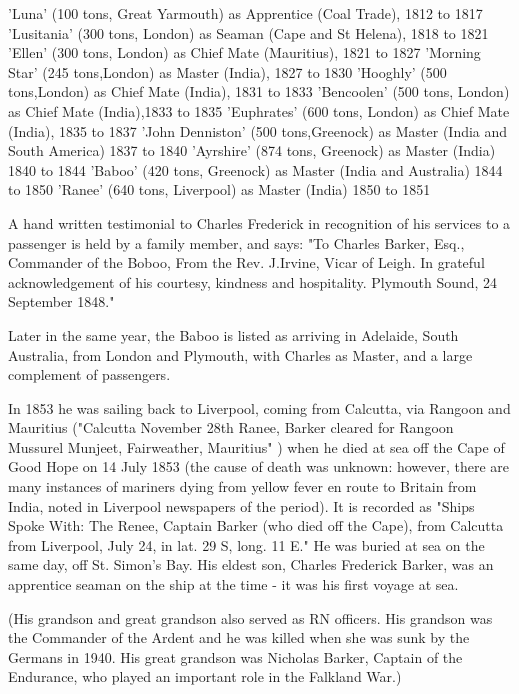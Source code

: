 'Luna' (100 tons, Great Yarmouth) as Apprentice (Coal Trade), 1812 to 1817
'Lusitania' (300 tons, London) as Seaman (Cape and St Helena), 1818 to 1821
'Ellen' (300 tons, London) as Chief Mate (Mauritius), 1821 to 1827
'Morning Star' (245 tons,London) as Master (India), 1827 to 1830
'Hooghly' (500 tons,London) as Chief Mate (India), 1831 to 1833
'Bencoolen' (500 tons, London) as Chief Mate (India),1833 to 1835
'Euphrates' (600 tons, London) as Chief Mate (India), 1835 to 1837
'John Denniston' (500 tons,Greenock) as Master (India and South America) 1837 to 1840
'Ayrshire' (874 tons, Greenock) as Master (India) 1840 to 1844
'Baboo' (420 tons, Greenock) as Master (India and Australia) 1844 to 1850
'Ranee' (640 tons, Liverpool) as Master (India) 1850 to 1851
\cite{CFBShipList}


A hand written testimonial to Charles Frederick in recognition of his services to a passenger is held by a family member, and says:
"To Charles Barker, Esq., Commander of the Boboo,
From the Rev. J.Irvine, Vicar of Leigh.
In grateful acknowledgement of his courtesy, kindness and hospitality.
Plymouth Sound, 24 September 1848."

Later in the same year, the Baboo is listed as arriving in Adelaide, South Australia, from London and Plymouth, with Charles as Master, and a large complement of passengers.\cite{CFBBaboo}

In 1853 he was sailing back to Liverpool, coming from Calcutta, via Rangoon and Mauritius ("Calcutta November 28th Ranee, Barker cleared for Rangoon Mussurel Munjeet, Fairweather, Mauritius" \cite{CFBRanee}) when he died at sea off the Cape of Good Hope on 14 July 1853 (the cause of death was unknown: however, there are many instances of mariners dying from yellow fever en route to Britain from India, noted in Liverpool newspapers of the period). It is recorded as  "Ships Spoke With: The Renee, Captain Barker (who died off the Cape), from Calcutta from Liverpool, July 24, in lat. 29 S, long. 11 E."\cite{CFBDeath}
He was buried at sea on the same day, off St. Simon's Bay. His eldest son, Charles Frederick Barker, was an apprentice seaman on the ship at the time - it was his first voyage at sea.

(His grandson and great grandson also served as RN officers. His grandson was the Commander of the Ardent and he was killed when she was sunk by the Germans in 1940. His great grandson was Nicholas Barker, Captain of the Endurance, who played an important role in the Falkland War.)

